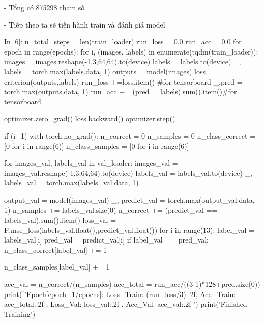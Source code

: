\documentclass[12pt, a4paper]{article}
\begin{document}
\par - Tổng có 875298 tham số
\vspace{0.5cm}
\par - Tiếp theo ta sẽ tiến hành train và đánh giá model
\newpage

\begin{python}
In [6]:
n_total_steps = len(train_loader)
run_loss = 0.0
run_acc = 0.0
for epoch in range(epochs):
    for i, (images, labels) in enumerate(tqdm(train_loader)):
        images = images.reshape(-1,3,64,64).to(device)
        labels = labels.to(device)
        _, labels = torch.max(labels.data, 1)
        outputs = model(images)
        loss = criterion(outputs,labels)
        run_loss +=loss.item() #for tensorboard
        _,pred = torch.max(outputs.data, 1)
        run_acc += (pred==labels).sum().item()#for tensorboard
        
        optimizer.zero_grad()
        loss.backward()
        optimizer.step()
        
        if (i+1) %
            with torch.no_grad():
                n_correct = 0
                n_samples = 0
                n_class_correct = [0 for i in range(6)]
                n_class_samples = [0 for i in range(6)]
                
                for images_val, labels_val in val_loader:
                    images_val = images_val.reshape(-1,3,64,64).to(device)
                    labels_val = labels_val.to(device)
                    _, labels_val = torch.max(labels_val.data, 1)
                    
                    output_val = model(images_val)
                    _, predict_val = torch.max(output_val.data, 1)
                    n_samples += labels_val.size(0)
                    n_correct += (predict_val == labels_val).sum().item()
                    loss_val = F.mse_loss(labels_val.float(),predict_val.float())
                    for i in range(13):
                        label_val = labels_val[i]
                        pred_val = predict_val[i]
                        if label_val == pred_val:
                            n_class_correct[label_val] += 1
                            
                        n_class_samples[label_val] += 1
                        
                acc_val = n_correct/(n_samples)
                acc_total = run_acc/((3-1)*128+pred.size(0))
                print(f'Epoch[{epoch+1}/{epochs}]: Loss_Train: {(run_loss/3):.2f}, Acc_Train: {acc_total:.2f} , Loss_Val: {loss_val:.2f} , Acc_Val: {acc_val:.2f} ')
print('Finished Training')
\end{python}
\end{document}
